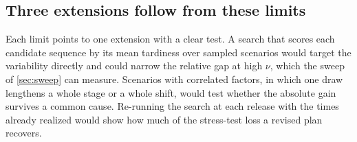 \subsection{Three extensions follow from these limits}\label{sec:next}

\sumpara Each limit points to one extension with a clear test. \sumparaend
\fin A search that scores each candidate sequence by its mean tardiness over sampled scenarios would target the variability directly and could narrow the relative gap at high $\nu$, which the sweep of \cref{sec:sweep} can measure. \fine
\fin Scenarios with correlated factors, in which one draw lengthens a whole stage or a whole shift, would test whether the absolute gain survives a common cause. \fine
\fin Re-running the search at each release with the times already realized would show how much of the stress-test loss a revised plan recovers. \fine
